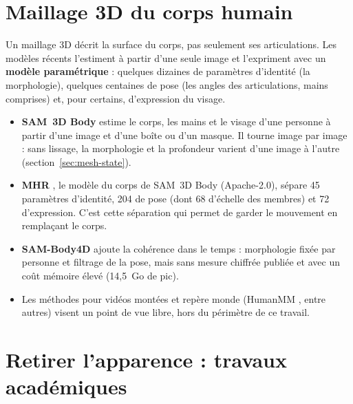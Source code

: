 \documentclass[11pt,a4paper]{report}
\begin{document}
\section{Maillage 3D du corps humain}
\label{sec:sota-mesh}

Un maillage 3D décrit la surface du corps, pas seulement ses articulations. Les modèles récents l'estiment à partir d'une seule image
et l'expriment avec un \textbf{modèle paramétrique} : quelques dizaines de paramètres d'identité (la morphologie), quelques centaines
de pose (les angles des articulations, mains comprises) et, pour certains, d'expression du visage.

\begin{itemize}
    \item \textbf{SAM~3D Body} \cite{sam3dbody2026} estime le corps, les mains et le visage d'une personne à partir d'une image et
    d'une boîte ou d'un masque. Il tourne image par image : sans lissage, la morphologie et la profondeur varient d'une image à
    l'autre (section~\ref{sec:mesh-state}).
    \item \textbf{MHR} \cite{mhr2025}, le modèle du corps de SAM~3D Body (Apache-2.0), sépare 45 paramètres d'identité, 204 de pose
    (dont 68 d'échelle des membres) et 72 d'expression. C'est cette séparation qui permet de garder le mouvement en remplaçant le
    corps.
    \item \textbf{SAM-Body4D} \cite{sambody4d2025} ajoute la cohérence dans le temps : morphologie fixée par personne et filtrage de
    la pose, mais sans mesure chiffrée publiée et avec un coût mémoire élevé (14,5~Go de pic).
    \item Les méthodes pour vidéos montées et repère monde (HumanMM \cite{zhang2025humanmm}, entre autres) visent un point de vue
    libre, hors du périmètre de ce travail.
\end{itemize}

\section{Retirer l'apparence : travaux académiques}
\label{sec:sota-appearance}
\end{document}
